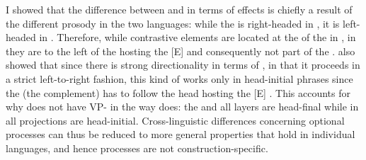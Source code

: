 I showed that the difference between  and  in terms of  effects is chiefly a result of the different prosody in the two languages: while the  is right-headed in , it is left-headed in . Therefore, while contrastive elements are located at the  of the  in , in  they are to the left of the  hosting the [E]  and consequently not part of the .  also showed that since there is strong directionality in terms of , in that it proceeds in a strict left-to-right fashion, this kind of  works only in head-initial phrases since the  (the complement) has to follow the head hosting the [E] . This accounts for why  does not have VP- in the way  does: the   and all  layers are head-final while in  all  projections are head-initial. Cross-linguistic differences concerning optional  processes can thus be reduced to more general properties that hold in individual languages, and hence  processes are not construction-specific.


